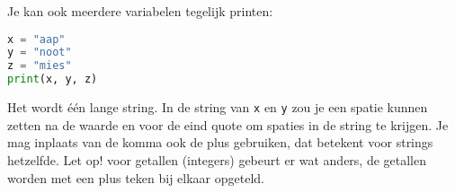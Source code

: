 Je kan ook meerdere variabelen tegelijk printen:
\begin{lstlisting}[language=python]
x = "aap"
y = "noot"
z = "mies"
print(x, y, z)
\end{lstlisting}
Het wordt \'e\'en lange string. In de string van \texttt{x} en \texttt{y} zou je een spatie kunnen zetten na de waarde en voor de eind quote om spaties in de string te krijgen. Je mag inplaats van de komma ook de plus gebruiken, dat betekent voor strings hetzelfde. Let op! voor getallen (integers) gebeurt er wat anders, de getallen worden met een plus teken bij elkaar opgeteld.

